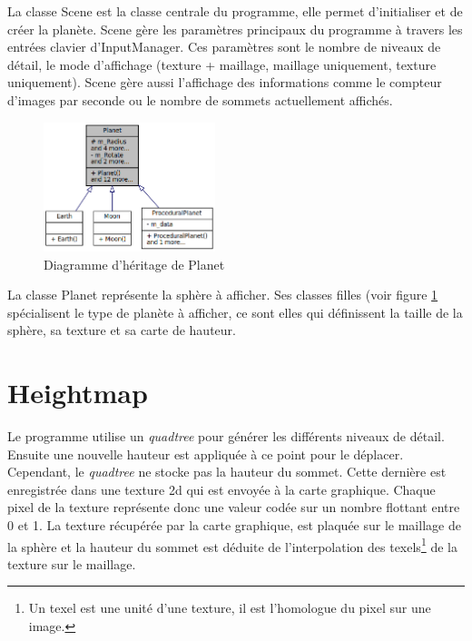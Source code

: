   La classe Scene est la classe centrale du programme, elle permet
  d'initialiser et de créer la planète. Scene gère les paramètres
  principaux du programme à travers les entrées clavier d'InputManager.
  Ces paramètres sont le nombre de niveaux de détail, le mode d'affichage
  (texture + maillage, maillage uniquement, texture uniquement). Scene
  gère aussi l'affichage des informations comme le compteur d'images par
  seconde ou le nombre de sommets actuellement affichés.\\
  
  \begin{figure}[!ht]
  \centering
  \includegraphics[width=5cm]{img/planet_inh.png}
  \caption{Diagramme d'héritage de Planet}
  \label{fig:inh_planet}
  \end{figure}

  La classe Planet représente la sphère à afficher. Ses classes filles
  (voir figure \ref{fig:inh_planet} spécialisent le type de planète
  à afficher, ce sont elles qui définissent la taille de la sphère,
  sa texture et sa carte de hauteur.\\

  \newpage
  \newpage
\section{Heightmap}
  
  Le programme utilise un \emph{quadtree} pour générer les différents niveaux de détail. 
  Ensuite une nouvelle hauteur est appliquée à ce point pour le déplacer. 
  Cependant, le \emph{quadtree} ne stocke pas la hauteur du sommet. Cette dernière
  est enregistrée dans une texture 2d qui est envoyée à la carte graphique. 
  Chaque pixel de la texture représente donc une valeur codée sur un nombre flottant entre 0 et 1.
  La texture récupérée par la carte graphique, est plaquée sur le maillage de la sphère et la hauteur du sommet
  est déduite de l'interpolation des texels\footnote{Un texel est une unité d'une texture, il est l'homologue du pixel sur une image.} de la texture sur le maillage.
  
